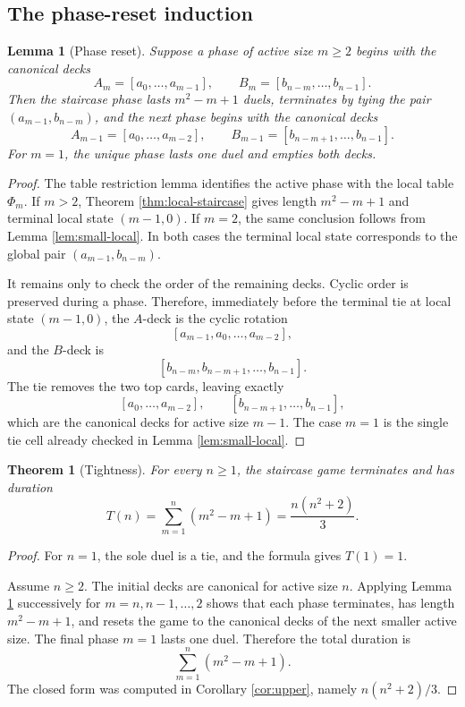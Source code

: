 \documentclass[11pt]{article}
\newtheorem{theorem}{Theorem}
\newtheorem{lemma}{Lemma}
\theoremstyle{definition}
\theoremstyle{remark}
\begin{document}
\subsection{The phase-reset induction}
\begin{lemma}[Phase reset]\label{lem:phase-reset}
Suppose a phase of active size $m\ge 2$ begins with the canonical decks
\[
A_m=[a_0,\dots,a_{m-1}],\qquad B_m=[b_{n-m},\dots,b_{n-1}].
\]
Then the staircase phase lasts $m^2-m+1$ duels, terminates by tying the pair $(a_{m-1},b_{n-m})$, and the next phase begins with the canonical decks
\[
A_{m-1}=[a_0,\dots,a_{m-2}],\qquad B_{m-1}=[b_{n-m+1},\dots,b_{n-1}].
\]
For $m=1$, the unique phase lasts one duel and empties both decks.
\end{lemma}
\begin{proof}
The table restriction lemma identifies the active phase with the local table $\Phi_m$. If $m>2$, Theorem \ref{thm:local-staircase} gives length $m^2-m+1$ and terminal local state $(m-1,0)$. If $m=2$, the same conclusion follows from Lemma \ref{lem:small-local}. In both cases the terminal local state corresponds to the global pair $(a_{m-1},b_{n-m})$.

It remains only to check the order of the remaining decks. Cyclic order is preserved during a phase. Therefore, immediately before the terminal tie at local state $(m-1,0)$, the $A$-deck is the cyclic rotation
\[
[a_{m-1},a_0,\dots,a_{m-2}],
\]
and the $B$-deck is
\[
[b_{n-m},b_{n-m+1},\dots,b_{n-1}].
\]
The tie removes the two top cards, leaving exactly
\[
[a_0,\dots,a_{m-2}],\qquad [b_{n-m+1},\dots,b_{n-1}],
\]
which are the canonical decks for active size $m-1$. The case $m=1$ is the single tie cell already checked in Lemma \ref{lem:small-local}.
\end{proof}

\begin{theorem}[Tightness]\label{thm:tight}
For every $n\ge 1$, the staircase game terminates and has duration
\[
T(n)=\sum_{m=1}^n(m^2-m+1)=\frac{n(n^2+2)}{3}.
\]
\end{theorem}
\begin{proof}
For $n=1$, the sole duel is a tie, and the formula gives $T(1)=1$.

Assume $n\ge2$. The initial decks are canonical for active size $n$. Applying Lemma \ref{lem:phase-reset} successively for $m=n,n-1,\dots,2$ shows that each phase terminates, has length $m^2-m+1$, and resets the game to the canonical decks of the next smaller active size. The final phase $m=1$ lasts one duel. Therefore the total duration is
\[
\sum_{m=1}^n(m^2-m+1).
\]
The closed form was computed in Corollary \ref{cor:upper}, namely $n(n^2+2)/3$.
\end{proof}
\end{document}
